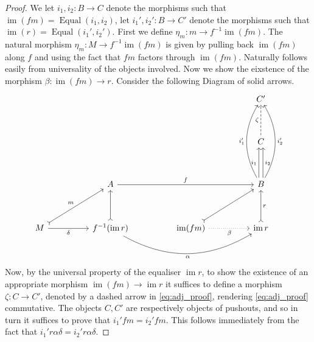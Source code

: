 \documentclass{tac}
\newcommand{\lto}{\longrightarrow}
\begin{document}
\begin{proof}
		We let $i_1,i_2: B \lto C$ denote the morphisms such that $\operatorname{im}(fm) = \operatorname{Equal}(i_1,i_2)$, let $i_1',i_2': B \lto C'$ denote the morphisms such that $\operatorname{im}(r) = \operatorname{Equal}(i_1',i_2')$. First we define $\eta_m: m \lto f^{-1}\operatorname{im}(fm)$. The natural morphism $\eta_m: M \lto f^{-1}\operatorname{im}(fm)$ is given by pulling back $\operatorname{im}(fm)$ along $f$ and using the fact that $fm$ factors through $\operatorname{im}(fm)$. Naturally follows easily from universality of the objects involved. Now we show the eixstence of the morphism $\beta: \operatorname{im}(fm) \lto r$. Consider the following Diagram of solid arrows.
		\begin{equation}\label{eq:adj_proof}
			\begin{tikzcd}[column sep = huge, row sep = huge]
				&&& C'\\
				&&& C\arrow[u,dashed,"{\zeta}"] \\
				&A\arrow[rr,"{f}"] && B\arrow[u,shift left,"{i_1}"]\arrow[u,shift right, swap,"{i_2}"]\arrow[uu,bend left, "{i_1'}"]\arrow[uu,bend right,swap,"{i_2'}"]\\
				M\arrow[ur,rightarrowtail,"{m}"]\arrow[r,swap,"{\delta}"] & f^{-1}(\operatorname{im}r)\arrow[u,rightarrowtail]\arrow[rr,bend right,swap,"{\alpha}"] & \operatorname{im}(fm)\arrow[ur,rightarrowtail]\arrow[r,dotted,swap,"{\beta}"] & \operatorname{im}r\arrow[u,rightarrowtail,swap,"{r}"]
			\end{tikzcd}
		\end{equation}
		Now, by the universal property of the equaliser $\operatorname{im}r$, to show the existence of an appropriate morphism $\operatorname{im}(fm) \lto \operatorname{im}r$ it suffices to define a morphism $\zeta: C \lto C'$, denoted by a dashed arrow in \eqref{eq:adj_proof}, rendering \eqref{eq:adj_proof} commutative. The objects $C,C'$ are respectively objects of pushouts, and so in turn it suffices to prove that $i_1' f m = i_2' f m$. This follows immediately from the fact that $i_1' r \alpha \delta = i_2' r \alpha \delta$.
		
		
	\end{proof}
	
\end{document}
